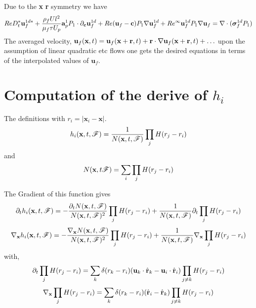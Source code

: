 Due to the \textbf{x} \textbf{r} symmetry we have 
\begin{align*}
    Re D_t^*  \textbf{u}_f^{1d*}  
    +  \frac{\rho_f U l^2 }{\mu_f \tau U_p}  \textbf{a}_p^1  P_1   \cdot \partial_\textbf{c} \textbf{u}_f^{1d} 
    + Re ( \textbf{u}_f -   \textbf{c}  ) P_1 \mathbf{\nabla} \textbf{u}_f^{1d}
    + Re^\infty \textbf{u}_f^{1d} P_1 \mathbf{\nabla}\textbf{u}_f
    = 
    \mathbf{\nabla}\cdot ( \bm\sigma_f^{1d} P_1)
\end{align*}
The averaged velocity, 
$\textbf{u}_f(\textbf{x},t) = \textbf{u}_f(\textbf{x}+ \textbf{r},t) + \textbf{r}\cdot \mathbf{\nabla} \textbf{u}_f(\textbf{x}+ \textbf{r},t)+ \ldots$ upon the assumption of linear quadratic etc flows one gets the desired equations in terms of the interpolated values of $\textbf{u}_f$. 




\section*{Computation of the derive of $h_i$}

The definitions with $r_i = |\textbf{x}_i - \textbf{x}|$.  
\begin{equation*}
    h_i(\textbf{x},t,\mathscr{F})
    = 
    \frac{1}{N(\textbf{x},t,\mathscr{F})}
    \prod_j
    H(r_j - r_i)
\end{equation*}
and 
\begin{equation*}
    N(\textbf{x},t\mathscr{F})
    = \sum_i \prod_j 
    H(r_j - r_i)
\end{equation*}

The Gradient of this function gives
\begin{equation*}
    \partial_t  h_i(\textbf{x},t,\mathscr{F})
    = 
    -  \frac{\partial_t N(\textbf{x},t,\mathscr{F})}{N(\textbf{x},t,\mathscr{F})^2}
    \prod_j
    H(r_j - r_i)
    + \frac{1}{N(\textbf{x},t,\mathscr{F})}
    \partial_t \prod_j
    H(r_j - r_i)
\end{equation*}
\begin{equation*}
    {\mathbf{\nabla}_\textbf{x}}  h_i(\textbf{x},t,\mathscr{F})
    = 
    -  \frac{{\mathbf{\nabla}_\textbf{x}} N(\textbf{x},t,\mathscr{F})}{N(\textbf{x},t,\mathscr{F})^2}
    \prod_j
    H(r_j - r_i)
    + \frac{1}{N(\textbf{x},t,\mathscr{F})}
    {\mathbf{\nabla}_\textbf{x}} \prod_j
    H(r_j - r_i)
\end{equation*}
with, 
\begin{equation*}
    \partial_t 
    \prod_j
    H(r_j - r_i)
    = 
    \sum_k 
    \delta(r_k - r_i)
    (\textbf{u}_k  \cdot \hat{\textbf{r}}_k - \textbf{u}_i  \cdot \hat{\textbf{r}}_i)
    \prod_{j\neq k}
    H(r_j - r_i)
\end{equation*}
\begin{equation*}
    {\mathbf{\nabla}_\textbf{x}}
    \prod_j
    H(r_j - r_i)
    = 
    \sum_k 
    \delta(r_k - r_i)
    ( \hat{\textbf{r}}_i -  \hat{\textbf{r}}_k)
    \prod_{j\neq k}
    H(r_j - r_i)
\end{equation*}

